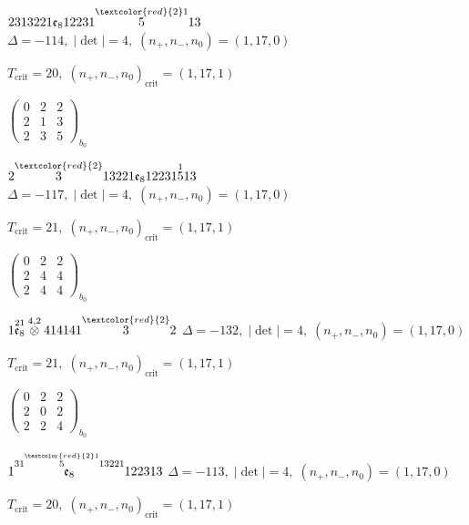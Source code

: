 \documentclass[10pt]{article}
\begin{document}
$2313221\mathfrak{e}_812231\overset{\textcolor{red}{2}1}{5}13$ \quad $\Delta=-114,\; |\det|=4,\; (n_+,n_-,n_0)=(1,17,0)$

\hspace{1em}$T_{\text{crit}}=20,\; (n_+,n_-,n_0)_{\text{crit}}=(1,17,1)$

\hspace{2em}$\left(\begin{smallmatrix}0 & 2 & 2 \\ 2 & 1 & 3 \\ 2 & 3 & 5\end{smallmatrix}\right)_{\!b_0}$

$2\overset{\textcolor{red}{2}}{3}13221\mathfrak{e}_812231\overset{1}{5}13$ \quad $\Delta=-117,\; |\det|=4,\; (n_+,n_-,n_0)=(1,17,0)$

\hspace{1em}$T_{\text{crit}}=21,\; (n_+,n_-,n_0)_{\text{crit}}=(1,17,1)$

\hspace{2em}$\left(\begin{smallmatrix}0 & 2 & 2 \\ 2 & 4 & 4 \\ 2 & 4 & 4\end{smallmatrix}\right)_{\!b_0}$

\smallskip

$1\overset{21}{\mathfrak{e}_8}\overset{4,2}{\otimes}414141\overset{\textcolor{red}{2}}{3}2$ \quad $\Delta=-132,\; |\det|=4,\; (n_+,n_-,n_0)=(1,17,0)$

\hspace{1em}$T_{\text{crit}}=21,\; (n_+,n_-,n_0)_{\text{crit}}=(1,17,1)$

\hspace{2em}$\left(\begin{smallmatrix}0 & 2 & 2 \\ 2 & 0 & 2 \\ 2 & 2 & 4\end{smallmatrix}\right)_{\!b_0}$

\smallskip

$1\overset{31\overset{\textcolor{red}{2}1}{5}13221}{\mathfrak{e}_8}122313$ \quad $\Delta=-113,\; |\det|=4,\; (n_+,n_-,n_0)=(1,17,0)$

\hspace{1em}$T_{\text{crit}}=20,\; (n_+,n_-,n_0)_{\text{crit}}=(1,17,1)$
\end{document}
